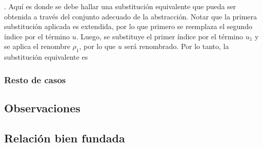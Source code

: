 \documentclass[]{report}
\begin{document}
	. Aquí es donde se debe hallar una substitución equivalente que pueda ser obtenida a través del conjunto adecuado de la abstracción.
	Notar que la primera substitución aplicada es extendida, por lo que primero se reemplaza el segundo índice por el término $u$.
	Luego, se substituye el primer índice por el término $u_1$ y se aplica el renombre $\rho_1$, por lo que $u$ será renombrado.
	Por lo tanto, la substitución equivalente es
	\AgdaSpace{}%
	\AgdaSpace{}%
	\AgdaSpace{}%
	\AgdaSpace{}%
	\AgdaSpace{}%
	\AgdaOperator{\AgdaInductiveConstructor{,}}\AgdaSpace{}%
	\AgdaSpace{}%
	\AgdaSpace{}%
	\AgdaSpace{}%
	\AgdaSpace{}%
	\AgdaSpace{}%
	\AgdaSpace{}%
	\AgdaSpace{}%
	\AgdaSpace{}%
	\AgdaSpace{}%
	
	
	\subsubsection{Resto de casos}

	
	
	
	\subsection{Observaciones}
	
	\subsection{Relación bien fundada}
	
\end{document}
